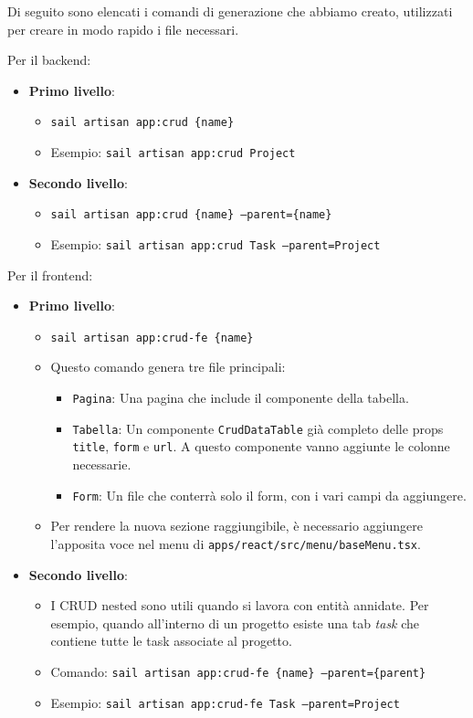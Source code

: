 Di seguito sono elencati i comandi di generazione che abbiamo creato, utilizzati per creare in modo rapido i file necessari.
\pagebreak

Per il backend:
\begin{itemize}
    \item \textbf{Primo livello}:
    \begin{itemize}
        \item \texttt{sail artisan app:crud \{name\}}
        \item Esempio: \texttt{sail artisan app:crud Project}
    \end{itemize}
    \item \textbf{Secondo livello}:
    \begin{itemize}
        \item \texttt{sail artisan app:crud \{name\} --parent=\{name\}}
        \item Esempio: \texttt{sail artisan app:crud Task --parent=Project}
    \end{itemize}
\end{itemize}
Per il frontend:
\begin{itemize}
    \item \textbf{Primo livello}:
    \begin{itemize}
        \item \texttt{sail artisan app:crud-fe \{name\}}
        \item Questo comando genera tre file principali:
        \begin{itemize}
            \item \texttt{Pagina}: Una pagina che include il componente della tabella.
            \item \texttt{Tabella}: Un componente \texttt{CrudDataTable} già completo delle props \texttt{title}, \texttt{form} e \texttt{url}. A questo componente vanno aggiunte le colonne necessarie.
            \item \texttt{Form}: Un file che conterrà solo il form, con i vari campi da aggiungere.
        \end{itemize}
        \item Per rendere la nuova sezione raggiungibile, è necessario aggiungere l'apposita voce nel menu di \texttt{apps/react/src/menu/baseMenu.tsx}.
    \end{itemize}
    \item \textbf{Secondo livello}:
    \begin{itemize}
        \item I CRUD nested sono utili quando si lavora con entità annidate. Per esempio, quando all'interno di un progetto esiste una tab \textit{task} che contiene tutte le task associate al progetto.
        \item Comando: \texttt{sail artisan app:crud-fe \{name\} --parent=\{parent\}}
        \item Esempio: \texttt{sail artisan app:crud-fe Task --parent=Project}
    \end{itemize}
\end{itemize}
